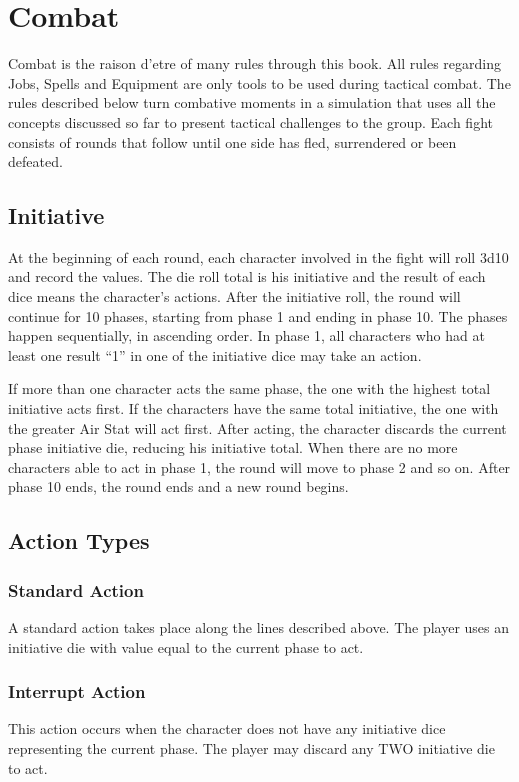 \section{Combat}\label{sec:combat}
\begin{multicols}{2}
Combat is the raison d’etre of many rules through this book. All rules regarding Jobs, Spells and Equipment are only tools to be used during tactical combat. The rules described below turn combative moments in a simulation that uses all the concepts discussed so far to present tactical challenges to the group. Each fight consists of rounds that follow until one side has fled, surrendered or been defeated.

\subsection{Initiative}\label{subsec:init}
At the beginning of each round, each character involved in the fight will roll 3d10 and record the values. The die roll total is his initiative and the result of each dice means the character's actions. After the initiative roll, the round will continue for 10 phases, starting from phase 1 and ending in phase 10. The phases happen sequentially, in ascending order. In phase 1, all characters who had at least one result ``1'' in one of the initiative dice may take an action.

If more than one character acts the same phase, the one with the highest total initiative acts first. If the characters have the same total initiative, the one with the greater Air Stat will act first. After acting, the character discards the current phase initiative die, reducing his initiative total. When there are no more characters able to act in phase 1, the round will move to phase 2 and so on. After phase 10 ends, the round ends and a new round begins.

\subsection{Action Types}\label{subsec:actions}
\subsubsection{Standard Action}
A standard action takes place along the lines described above. The player uses an initiative die with value equal to the current phase to act.

\subsubsection{Interrupt Action}
This action occurs when the character does not have any initiative dice representing the current phase. The player may discard any TWO initiative die to act.


\end{multicols}
